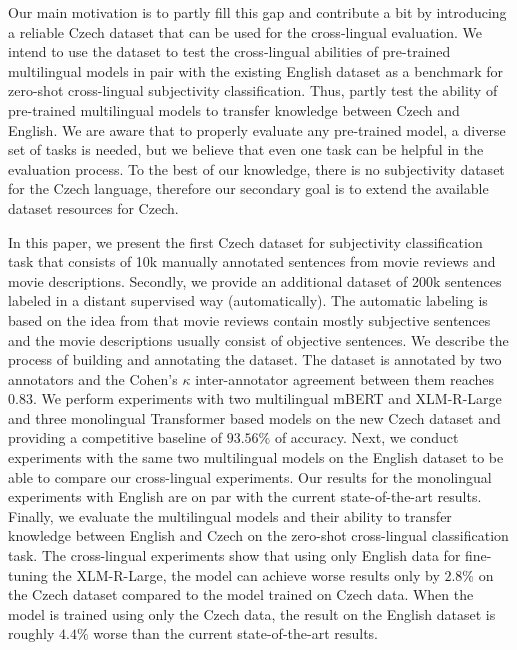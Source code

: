 \documentclass[10pt, a4paper]{article}
\begin{document}
\par Our main motivation is to partly fill this gap and contribute a bit by introducing a reliable Czech dataset that can be used for the cross-lingual evaluation. We intend to use the dataset to test the cross-lingual abilities of pre-trained multilingual models in pair with the existing English dataset \cite{english-dataset} as a benchmark for zero-shot cross-lingual subjectivity classification. Thus, partly test the ability of pre-trained multilingual models to transfer knowledge between Czech and English. We are aware that to properly evaluate any pre-trained model, a diverse set of tasks is needed, but we believe that even one task can be helpful in the evaluation process. To the best of our knowledge, there is no subjectivity dataset for the Czech language, therefore our secondary goal is to extend the available dataset resources for Czech.

In this paper, we present the first Czech dataset for subjectivity classification task that consists of 10k manually annotated sentences from movie reviews and movie descriptions. Secondly, we provide an additional dataset of 200k sentences labeled in a distant supervised way (automatically). The automatic labeling is based on the idea from \cite{english-dataset} that movie reviews contain mostly subjective sentences and the movie descriptions usually consist of objective sentences. We describe the process of building and annotating the dataset. The dataset is annotated by two annotators and the Cohen’s $\kappa$ \cite{cohen1960coefficient} inter-annotator agreement between them reaches $0.83$. We perform experiments with two multilingual mBERT \cite{devlin-etal-2019-bert} and XLM-R-Large \cite{xlm-r} and three monolingual Transformer based models on the new Czech dataset and providing a competitive baseline of $93.56\%$ of accuracy. Next, we conduct experiments with the same two multilingual models on the English dataset to be able to compare our cross-lingual experiments. Our results for the monolingual experiments with English are on par with the current state-of-the-art results. Finally, we evaluate the multilingual models and their ability to transfer knowledge between English and Czech on the zero-shot cross-lingual classification task. The cross-lingual experiments show that using only English data for fine-tuning the XLM-R-Large, the model can achieve worse results only by $2.8\%$ on the Czech dataset compared to the model trained on Czech data. When the model is trained using only the Czech data, the result on the English dataset is roughly $4.4\%$ worse than the current state-of-the-art results.
\end{document}
